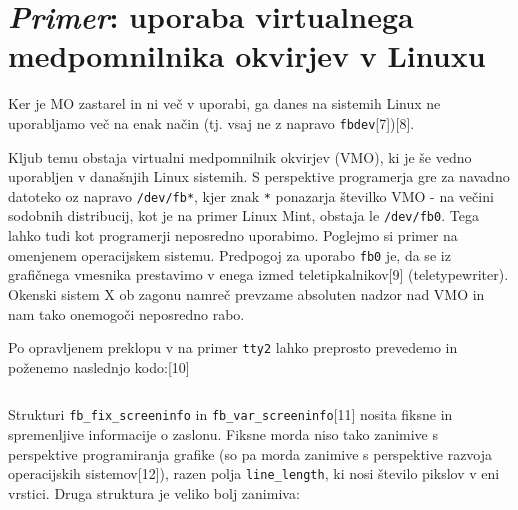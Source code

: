 \documentclass{article}
\begin{document}
\section{\textit{Primer}: uporaba virtualnega medpomnilnika okvirjev v Linuxu}
Ker je MO zastarel in ni več v uporabi, ga danes na sistemih Linux ne uporabljamo več na enak način (tj. vsaj ne z napravo \lstinline{fbdev}[7])[8].

Kljub temu obstaja virtualni medpomnilnik okvirjev (VMO), ki je še vedno uporabljen v današnjih Linux sistemih. S perspektive programerja gre za navadno datoteko oz napravo \lstinline{/dev/fb*}, kjer znak \lstinline{*} ponazarja številko VMO - na večini sodobnih distribucij, kot je na primer Linux Mint, obstaja le \lstinline{/dev/fb0}. Tega lahko tudi kot programerji neposredno uporabimo. Poglejmo si primer na omenjenem operacijskem sistemu.
Predpogoj za uporabo \lstinline{fb0} je, da se iz grafičnega vmesnika prestavimo v enega izmed teletipkalnikov[9] (teletypewriter). Okenski sistem X ob zagonu namreč prevzame absoluten nadzor nad VMO in nam tako onemogoči neposredno rabo.

Po opravljenem preklopu v na primer \lstinline{tty2} lahko preprosto prevedemo in poženemo naslednjo kodo:[10]

\inputminted{C}{framebuffer_testing.c}

Strukturi \lstinline{fb_fix_screeninfo} in \lstinline{fb_var_screeninfo}[11] nosita fiksne in spremenljive informacije o zaslonu. Fiksne morda niso tako zanimive s perspektive programiranja grafike (so pa morda zanimive s perspektive razvoja operacijskih sistemov[12]), razen polja \lstinline{line_length}, ki nosi število pikslov v eni vrstici. Druga struktura je veliko bolj zanimiva:
\end{document}
